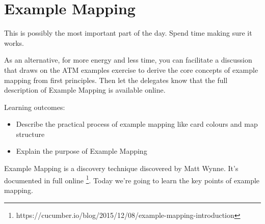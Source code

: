 \chapter*{Example Mapping}

\ifnotes
    
    This is possibly the most important part of the day. Spend time making sure it works.
    
    As an alternative, for more energy and less time, you can facilitate a discussion that draws on the ATM examples exercise to derive the core concepts of example mapping from first principles. Then let the delegates know that the full description of Example Mapping is available online.
    
    Learning outcomes:
    
    \begin{itemize}
        \item Describe the practical process of example mapping like card colours and map structure
        \item Explain the purpose of Example Mapping
    \end{itemize}
\fi 

\ifcontent
    Example Mapping is a discovery technique discovered by Matt Wynne. It's documented in full online \footnote{https://cucumber.io/blog/2015/12/08/example-mapping-introduction}. Today we're going to learn the key points of example mapping. 
    
